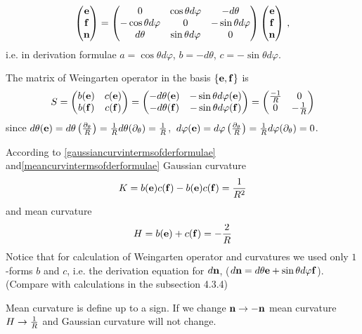 \documentclass[12pt]{article}
\theoremstyle{theorem}
\numberwithin{equation}{section}
\begin{document}
{\begin{equation}
                 \begin{pmatrix}
                    {\bf e}\cr{\bf f}\cr{\bf n}\cr
                    \end{pmatrix}=
                     \begin{pmatrix}
                    0&\cos\theta d\varphi& -d\theta\cr
                    -\cos\theta d\varphi&0&-\sin\theta d\varphi\cr
                     d\theta&\sin\theta d\varphi&0\cr
                    \end{pmatrix}
                 \begin{pmatrix}
                    {\bf e}\cr{\bf f}\cr{\bf n}\cr
                    \end{pmatrix}\,,
                   \end{equation}
  i.e. in derivation formulae $a=\cos\theta d\varphi$,
  $b=-d\theta$, $c=-\sin\theta d\varphi$.

  The matrix of Weingarten operator in the basis  $\{{\bf e},{\bf f}\}$ is
             $$
     S=
\begin{pmatrix}
b({\bf e})  &c({\bf e})\cr
b({\bf f})  &c({\bf f})\cr
\end{pmatrix}=
\begin{pmatrix}
-d\theta ({\bf e}) &-\sin\theta d\varphi ({\bf e})\cr
-d\theta ({\bf f})  &-\sin\theta d\varphi({\bf f})\cr
\end{pmatrix}=
\begin{pmatrix}
{-1\over R}  &0\cr
0  &-{1\over R}\cr
\end{pmatrix}
       $$
       since $d\theta({\bf e})=d\theta\left({\partial_\theta\over R}\right)={1\over R}d\theta(\partial_\theta)={1\over R}$,
       $\,d\varphi({\bf e})=d\varphi\left({\partial_\theta\over R}\right)={1\over R}d\varphi(\partial_\theta)=0$.

    According to  \eqref{gaussiancurvintermsofderformulae}  and\eqref{meancurvintermsofderformulae}
                Gaussian curvature $$
                K=b({\bf e})c({\bf f})-b({\bf e})c({\bf f})={1\over R^2}
                                    $$
                                    and
                mean curvature
                 $$
    H=b({\bf e})+c({\bf f})=-{2\over R}
                 $$
    Notice that for calculation of Weingarten operator and curvatures we used only
    $1$-forms $b$ and $c$, i.e. the derivation equation for $d{\bf n}$, ($d{\bf n}=d\theta {\bf e}+\sin\theta d\varphi {\bf f}$).
  (Compare with calculations in the subsection 4.3.4)





 Mean curvature is define up to a sign. If we change ${\bf n}\to-{\bf n}$ mean curvature $H\to {1\over R}$ and Gaussian curvature
will not change.


}
\end{document}
